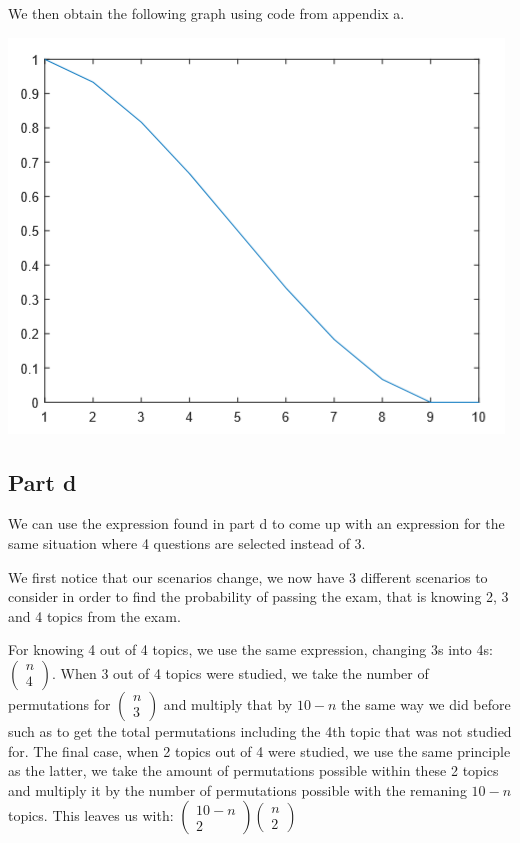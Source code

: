 \documentclass{article}
\begin{document}
We then obtain the following graph using code from appendix a.
\begin{center}
    \includegraphics[scale=0.5]{p1}
\end{center}


\subsection*{Part d}
We can use the expression found in part d to come up with an expression for the same situation
where 4 questions are selected instead of 3.

We first notice that our scenarios change, we now have 3 different scenarios to consider in order
to find the probability of passing the exam, that is knowing 2, 3 and 4 topics from the exam.

For knowing 4 out of 4 topics, we use the same expression, changing 3s into 4s:
$\begin{pmatrix} n \\ 4 \end{pmatrix}$.
When 3 out of 4 topics were studied, we take the number of permutations for
$\begin{pmatrix} n \\ 3 \end{pmatrix}$ and multiply that by $10 - n $ the same way we did before
such as to get the total permutations including the 4th topic that was not studied for.
The final case, when 2 topics out of 4 were studied, we use the same principle as the latter, we
take the amount of permutations possible within these 2 topics and multiply it by the number
of permutations possible with the remaning $ 10 - n $ topics. This leaves us with:
$\begin{pmatrix} 10 - n \\ 2 \end{pmatrix}\begin{pmatrix} n \\ 2 \end{pmatrix}$
\end{document}

